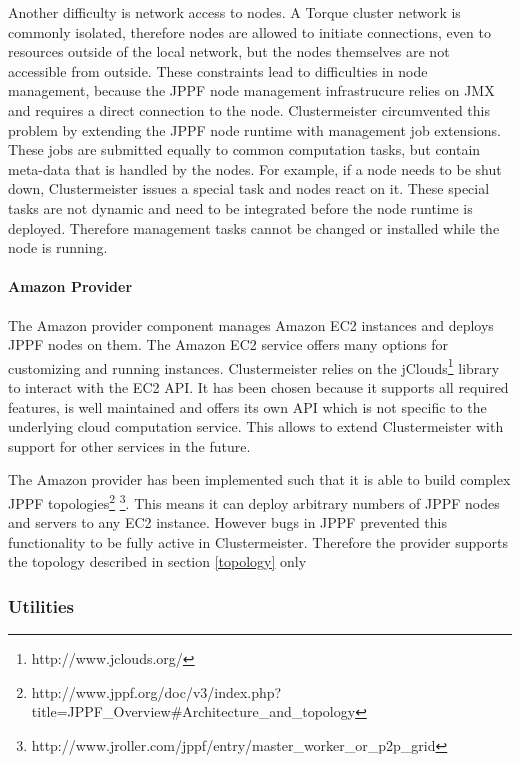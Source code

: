 \documentclass[english]{uzhpub}
\begin{document}
Another difficulty is network access to nodes. A Torque cluster network is commonly isolated, therefore nodes are allowed to initiate connections, even to resources outside of the local network, but the nodes themselves are not accessible from outside. These constraints lead to difficulties in node management, because the JPPF node management infrastrucure relies on JMX and requires a direct connection to the node. Clustermeister circumvented this problem by extending the JPPF node runtime with management job extensions. These jobs are submitted equally to common computation tasks, but contain meta-data that is handled by the nodes. For example, if a node needs to be shut down, Clustermeister issues a special task and nodes react on it. These special tasks are not dynamic and need to be integrated before the node runtime is deployed. Therefore management tasks cannot be changed or installed while the node is running.

\paragraph{Amazon Provider}
The Amazon provider component manages Amazon EC2 instances and deploys JPPF nodes on them. The Amazon EC2 service offers many options for customizing and running instances. Clustermeister relies on the jClouds\footnote{http://www.jclouds.org/} library to interact with the EC2 API. It has been chosen because it supports all required features, is well maintained and offers its own API which is not specific to the underlying cloud computation service. This allows to extend Clustermeister with support for other services in the future.

The Amazon provider has been implemented such that it is able to build complex JPPF topologies\footnote{http://www.jppf.org/doc/v3/index.php?title=JPPF\_Overview\#Architecture\_and\_topology} \footnote{http://www.jroller.com/jppf/entry/master\_worker\_or\_p2p\_grid}. This means it can deploy arbitrary numbers of JPPF nodes and servers to any EC2 instance. However bugs in JPPF prevented this functionality to be fully active in Clustermeister. Therefore the provider supports the topology described in section \ref{topology} only

\subsubsection{Utilities}
\end{document}

